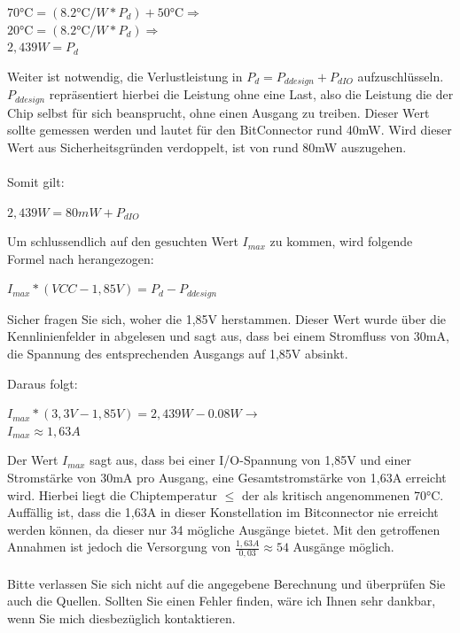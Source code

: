 \documentclass{article}
\begin{document}
\begin{center}
	$70 \si{\celsius} = (8.2 \si{\celsius}/W*P_d)+50 \si{\celsius} \Rightarrow$\\
	$20 \si{\celsius} = (8.2 \si{\celsius}/W*P_d)\Rightarrow$\\
	$2,439 W = P_d$\\ \vspace{0.5cm}
\end{center}
	Weiter ist notwendig, die Verlustleistung in $P_d = P_{ddesign} + P_{dIO}$ aufzuschlüsseln.
$P_{ddesign}$ repräsentiert hierbei die Leistung ohne eine Last, also die Leistung die der Chip selbst für sich beansprucht, ohne einen Ausgang zu treiben. Dieser Wert sollte gemessen werden und lautet für den BitConnector rund 40mW. Wird dieser Wert aus Sicherheitsgründen verdoppelt, ist von rund 80mW auszugehen.\\\\
Somit gilt: 
\begin{center}
	$2,439 W = 80mW + P_{dIO}$
\end{center}

Um schlussendlich auf den gesuchten Wert $I_{max}$ zu kommen, wird folgende Formel nach \autocite[16]{XC95_maxI} herangezogen:

\begin{center}
	$I_{max} * (VCC - 1,85V) = P_d - P_{ddesign}$
\end{center}

Sicher fragen Sie sich, woher die 1,85V herstammen. Dieser Wert wurde über die Kennlinienfelder in \autocite[6]{XC_Curves} abgelesen und sagt aus, dass bei einem Stromfluss von 30mA, die Spannung des entsprechenden Ausgangs auf 1,85V absinkt.

Daraus folgt: 
\begin{center}
	$I_{max} * (3,3V - 1,85V) = 2,439 W - 0.08W \rightarrow$\\
	\underline{\underline{$I_{max}\approx 1,63A $}}
\end{center}
Der Wert $I_{max}$ sagt aus, dass bei einer I/O-Spannung von 1,85V und einer Stromstärke von 30mA pro Ausgang, eine Gesamtstromstärke von 1,63A erreicht wird. Hierbei liegt die Chiptemperatur $\leq $ der als kritisch angenommenen 70$\si{\celsius}$. Auffällig ist, dass die 1,63A in dieser Konstellation im Bitconnector nie erreicht werden können, da dieser nur 34 mögliche Ausgänge bietet. Mit den getroffenen Annahmen ist jedoch die Versorgung von $\frac{1,63A}{0,03}\approx54$ Ausgänge möglich.\\\\
Bitte verlassen Sie sich nicht auf die angegebene Berechnung und überprüfen Sie auch die Quellen. Sollten Sie einen Fehler finden, wäre ich Ihnen sehr dankbar, wenn Sie mich diesbezüglich kontaktieren.
\end{document}
